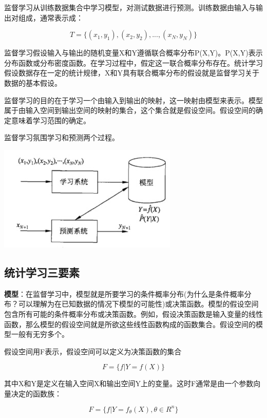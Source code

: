 \documentclass{ctexart}
\begin{document}
	监督学习从训练数据集合中学习模型，对测试数据进行预测。训练数据由输入与输出对组成，通常表示成：
	
	\[T=\{(x_1,y_1),(x_2,y_2),...,(x_N,y_N)\}\]
	
	监督学习假设输入与输出的随机变量X和Y遵循联合概率分布P(X,Y)。P(X,Y)表示分布函数或分布密度函数。在学习过程中，假定这一联合概率分布存在。统计学习假设数据存在一定的统计规律，{\color{red}X和Y具有联合概率分布的假设就是监督学习关于数据的基本假设。}
	
	监督学习的目的在于学习一个由输入到输出的映射，这一映射由模型来表示。模型属于由输入空间到输出空间的映射的集合，这个集合就是假设空间。假设空间的确定意味着学习范围的确定。
	
	监督学习氛围学习和预测两个过程。
	
	\begin{center}
		\includegraphics[width=0.8\linewidth]{pic/supervised_learning_problem}
		\label{fig:supervised-learning-problem}
	\end{center}

	\subsection{统计学习三要素}
	
	\textbf{模型}：在监督学习中，模型就是所要学习的条件概率分布(为什么是条件概率分布？可以理解为在已知数据的情况下模型的可能性)或决策函数。模型的假设空间包含所有可能的条件概率分布或决策函数。例如，假设决策函数是输入变量的线性函数，那么模型的假设空间就是所欲这些线性函数构成的函数集合。假设空间的模型一般有无穷多个。
	
	假设空间用F表示，假设空间可以定义为决策函数的集合
	
	\[F=\{f|Y=f(X)\}\]
	
	其中X和Y是定义在输入空间X和输出空间Y上的变量。这时F通常是由一个参数向量决定的函数族：
	
	\[F=\{f|Y=f_\theta(X), \theta \in R^n\}\]
	
\end{document}
